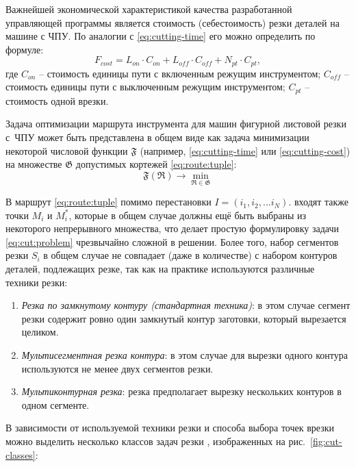 Важнейшей экономической характеристикой качества
разработанной управляющей программы является стоимость
(себестоимость) резки деталей на машине с ЧПУ.
По аналогии с \eqref{eq:cutting-time}
его можно определить по формуле:
\begin{equation}
  F_{cost}=
  L_{on} \cdot C_{on} +
  L_{off} \cdot C_{off} +
  N_{pt} \cdot C_{pt}
  ,
  \label{eq:cutting-cost}
\end{equation}
где
$C_{on}$ -- стоимость единицы пути с включенным режущим инструментом;
$C_{off}$ -- стоимость единицы пути с выключенным режущим инструментом;
$C_{pt}$ -- стоимость одной врезки.

Задача оптимизации маршрута инструмента для машин фигурной листовой резки с~ЧПУ
может быть представлена в общем виде
как задача минимизации некоторой числовой функции
$\mathfrak F$
(например, \eqref{eq:cutting-time} или \eqref{eq:cutting-cost})
на множестве
$\mathfrak G$ допустимых кортежей
\eqref{eq:route:tuple}:
\begin{equation}
  \mathfrak F(\mathfrak R) \to \min_{\mathfrak R \in \mathfrak G}
  \label{eq:cut:problem}
\end{equation}

В маршрут \eqref{eq:route:tuple} помимо перестановки
$I = (i_1, i_2, ... i_N)$.
входят также точки $M_i$ и $M_i^*$,
которые в общем случае должны ещё быть выбраны
из некоторого непрерывного множества,
что делает простую формулировку задачи \eqref{eq:cut:problem}
чрезвычайно сложной в решении.
Более того,
набор сегментов резки $S_i$
в общем случае не совпадает
(даже в количестве)
с набором контуров деталей,
подлежащих резке,
так как на практике используются различные техники резки:
\begin{enumerate}
  \item
  {\it Резка по замкнутому контуру (стандартная техника)}:
  в этом случае сегмент резки содержит
  ровно один замкнутый контур заготовки,
  который вырезается целиком.
  \item
  {\it Мультисегментная резка контура}:
  в этом случае для вырезки одного контура
  используются не менее двух сегментов резки.
  \item
  {\it Мультиконтурная резка}:
  резка предполагает вырезку нескольких
  контуров в одном сегменте.
\end{enumerate}

В зависимости от используемой техники резки и
способа выбора точек врезки можно выделить
несколько классов задач резки
\autocite[]{bi:dewil-review},
изображенных на рис.~\ref{fig:cut-classes}:

